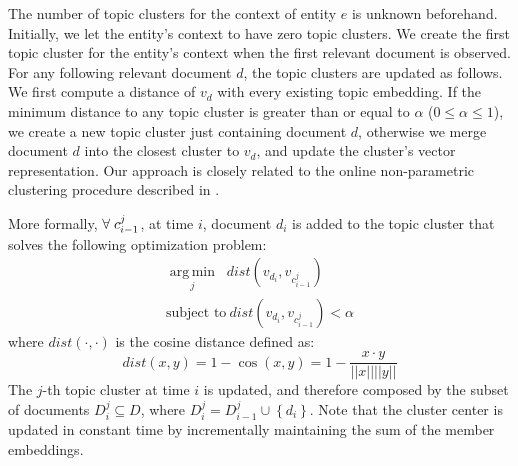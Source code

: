 \documentclass{article}
\DeclareMathOperator*{\argmin}{arg\,min}
\begin{document}
The number of topic clusters for the context of entity $e$ is unknown beforehand. Initially, we let the entity's context to have zero topic clusters. 
We create the first topic cluster for the entity's context when the first relevant document is observed. 
For any following relevant document $d$, the topic clusters are updated as follows.
We first compute a distance of $v_d$ with every existing topic embedding.
If the minimum distance to any topic cluster is greater than or equal to $\alpha$ ($0 \leq \alpha \leq 1$), we create a new topic cluster just containing document $d$, otherwise we merge document $d$ into the closest cluster to $v_d$, and update the cluster's vector representation.
Our approach is closely related to the online non-parametric clustering procedure described in \citet{Arvind14}.


More formally, $\forall\hspace{1mm}c^j_{i-1}$, at time $i$, document $d_i$ is added to the topic cluster that solves the following optimization problem:
\begin{eqnarray}
\underset{j}{\argmin}\;\; dist(v_{d_i}, v_{c^j_{i-1}}) \nonumber\\
\text{subject to}~dist(v_{d_i}, v_{c^j_{i-1}}) < \alpha 
\end{eqnarray}
where $dist(\cdot,\cdot)$ is the cosine distance defined as: %
\begin{equation}
\label{cosine}
dist(x,y) = 1 - \cos(x,y) = 1 - \frac{x \cdot y}{||x||||y||}
\end{equation}
The $j$-th topic cluster at time $i$ is updated, and therefore composed by the subset of documents $D^j_i \subseteq D$, where $D^j_i = D^j_{i-1} \cup \left\{ {d_i}\right\}$.
Note that the cluster center is updated in constant time by incrementally maintaining the sum of the member embeddings.

\end{document}
